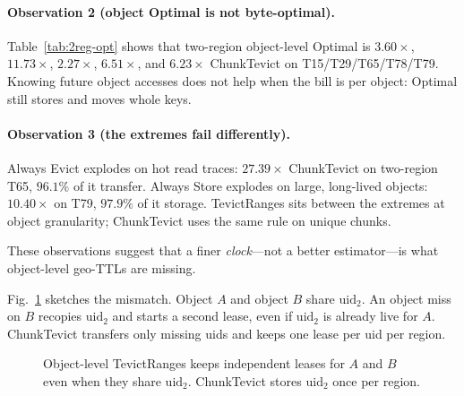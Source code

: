 \paragraph{Observation 2 (object Optimal is not byte-optimal).}
Table~\ref{tab:2reg-opt} shows that two-region object-level Optimal is $3.60\times$, $11.73\times$, $2.27\times$, $6.51\times$, and $6.23\times$ ChunkTevict on {T}15/{T}29/{T}65/{T}78/{T}79.
Knowing future object accesses does not help when the bill is per object: Optimal still stores and moves whole keys.

\paragraph{Observation 3 (the extremes fail differently).}
Always Evict explodes on hot read traces: $27.39\times$ ChunkTevict on two-region {T}65, $96.1\%$ of it transfer.
Always Store explodes on large, long-lived objects: $10.40\times$ on {T}79, $97.9\%$ of it storage.
TevictRanges sits between the extremes at object granularity; ChunkTevict uses the same rule on unique chunks.

These observations suggest that a finer \emph{clock}---not a better estimator---is what object-level geo-{TTL}s are missing.

Fig.~\ref{fig:mismatch} sketches the mismatch.
Object $A$ and object $B$ share $\mathrm{uid}_2$.
An object miss on $B$ recopies $\mathrm{uid}_2$ and starts a second lease, even if $\mathrm{uid}_2$ is already live for $A$.
ChunkTevict transfers only missing uids and keeps one lease per uid per region.

\begin{figure}[t]
\centering
{}
\caption{Object-level TevictRanges keeps independent leases for $A$ and $B$ even when they share $\mathrm{uid}_2$. ChunkTevict stores $\mathrm{uid}_2$ once per region.}
\label{fig:mismatch}
\end{figure}
